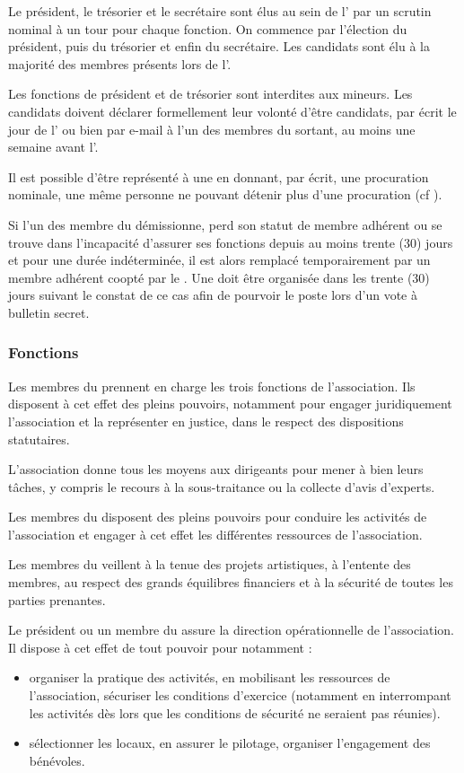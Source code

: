 Le président, le trésorier et le secrétaire sont élus au sein de l'\AG{} par un scrutin nominal à un tour pour chaque fonction. On commence par l'élection du président, puis du trésorier et enfin du secrétaire.  Les candidats sont élu à la majorité des membres présents lors de l'\AG{}.

Les fonctions de président et de trésorier sont interdites aux mineurs. Les candidats doivent déclarer formellement leur volonté d'être candidats, par écrit le jour de l'\AG{} ou bien par e-mail à l'un des membres du \bureau{} sortant, au moins une semaine avant l'\AG{}.


Il est possible d'être représenté à une \AG{} en donnant, par écrit, une procuration nominale, une même personne ne pouvant détenir plus
d'une procuration (cf ).

Si l'un des membre du \bureau{} démissionne, perd son statut de membre adhérent ou se trouve dans l'incapacité d'assurer ses fonctions depuis au moins trente (30) jours et pour une durée indéterminée, il est alors remplacé temporairement par un membre adhérent coopté par le \bureau{}. Une \AGE{} doit être organisée dans les trente (30) jours suivant le constat de ce cas afin de pourvoir le poste lors d'un vote à bulletin secret.

\subsubsection*{Fonctions}
\label{sec:fonctions}

Les membres du \bureau{} prennent en charge les trois fonctions de
l'association.  Ils disposent à cet effet des pleins pouvoirs,
notamment pour engager juridiquement l'association et la représenter
en justice, dans le respect des dispositions statutaires.

L'association donne tous les moyens aux dirigeants pour mener à bien
leurs tâches, y compris le recours à la sous-traitance ou la collecte
d'avis d'experts.

Les membres du \bureau{} disposent des pleins pouvoirs pour conduire les
activités de l'association et engager à cet effet les différentes
ressources de l'association.

Les membres du \bureau{} veillent à la tenue des projets artistiques, à
l'entente des membres, au respect des grands équilibres financiers
et à la sécurité de toutes les parties prenantes. 


Le président ou un membre du \bureau{} assure la direction opérationnelle de
l'association. Il dispose à cet effet de tout pouvoir pour notamment :
\begin{itemize}
\item organiser la pratique des activités, en mobilisant les ressources de l'association, sécuriser les conditions d'exercice (notamment en interrompant les activités dès lors que les conditions de sécurité ne seraient pas réunies).
\item sélectionner les locaux, en assurer le pilotage, organiser l'engagement des bénévoles.
\end{itemize}

